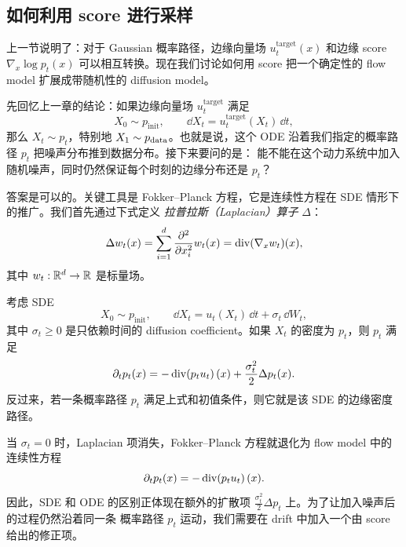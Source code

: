\subsection{如何利用 score 进行采样}

上一节说明了：对于 Gaussian 概率路径，边缘向量场
$u_t^{\mathrm{target}}(x)$ 和边缘 score
$\nabla_x \log p_t(x)$ 可以相互转换。现在我们讨论如何用 score
把一个确定性的 flow model 扩展成带随机性的 diffusion model。

先回忆上一章的结论：如果边缘向量场 $u_t^{\mathrm{target}}$ 满足
\begin{equation}
  X_0\sim p_{\mathrm{init}},
  \qquad
  \dd X_t=u_t^{\mathrm{target}}(X_t)\,\dd t,
\end{equation}
那么 $X_t\sim p_t$，特别地 $X_1\sim p_{\mathrm{data}}$。也就是说，这个 ODE
沿着我们指定的概率路径 $p_t$ 把噪声分布推到数据分布。接下来要问的是：
能不能在这个动力系统中加入随机噪声，同时仍然保证每个时刻的边缘分布还是
$p_t$？

答案是可以的。关键工具是 Fokker--Planck 方程，它是连续性方程在 SDE
情形下的推广。我们首先通过下式定义 \emph{拉普拉斯（Laplacian）算子} $\Delta$：
\begin{equation}
\Delta w_t(x)
=
\sum_{i=1}^d \frac{\partial^2}{\partial x_i^2} w_t(x)
=
\operatorname{div}(\nabla_x w_t)(x),
\end{equation}
其中 $w_t:\mathbb{R}^d\to\mathbb{R}$ 是标量场。

\begin{theorem}
考虑 SDE
\begin{equation}
  X_0\sim p_{\mathrm{init}},
  \qquad
  \dd X_t=u_t(X_t)\,\dd t+\sigma_t\,\dd W_t,
\end{equation}
其中 $\sigma_t\ge 0$ 是只依赖时间的 diffusion coefficient。如果
$X_t$ 的密度为 $p_t$，则 $p_t$ 满足
\begin{equation}
  \partial_t p_t(x)
  =
  -\operatorname{div}\!\left(p_t u_t\right)(x)
  +\frac{\sigma_t^2}{2}\Delta p_t(x).
\end{equation}
反过来，若一条概率路径 $p_t$ 满足上式和初值条件，则它就是该 SDE
的边缘密度路径。
\end{theorem}

当 $\sigma_t=0$ 时，Laplacian 项消失，Fokker--Planck 方程就退化为
flow model 中的连续性方程
\begin{equation}
  \partial_t p_t(x)
  =
  -\operatorname{div}\!\left(p_t u_t\right)(x).
\end{equation}
因此，SDE 和 ODE 的区别正体现在额外的扩散项
$\frac{\sigma_t^2}{2}\Delta p_t$ 上。为了让加入噪声后的过程仍然沿着同一条
概率路径 $p_t$ 运动，我们需要在 drift 中加入一个由 score 给出的修正项。

